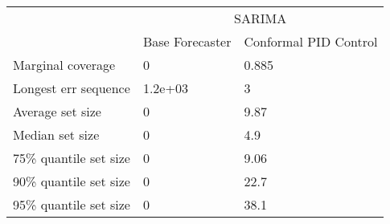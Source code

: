\begin{tabular}{lll}
\toprule
& \multicolumn{2}{c}{SARIMA} \\
& Base Forecaster & Conformal PID Control \\
\midrule
Marginal coverage & 0 & 0.885 \\
Longest err sequence & 1.2e+03 & 3 \\
Average set size & 0 & 9.87 \\
Median set size & 0 & 4.9 \\
75\% quantile set size & 0 & 9.06 \\
90\% quantile set size & 0 & 22.7 \\
95\% quantile set size & 0 & 38.1 \\
\bottomrule
\end{tabular}
